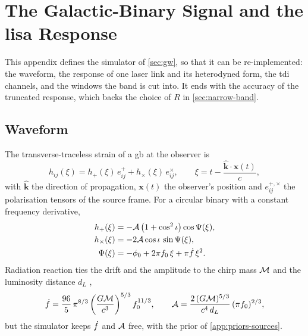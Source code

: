 \section{The Galactic-Binary Signal and the \acs{lisa} Response}
\label{app:forward-model}

This appendix defines the simulator of \cref{sec:gw}, so that it can be re-implemented: the waveform,
the response of one laser link and its heterodyned form, the \ac{tdi} channels, and the windows the
band is cut into. It ends with the accuracy of the truncated response, which backs the choice of $R$
in \cref{sec:narrow-band}.

\subsection{Waveform}
\label{app:forward-model-waveform}

The transverse-traceless strain of a \ac{gb} at the observer is
\begin{equation}
  h_{ij}(\xi) = h_+(\xi)\,e^+_{ij} + h_\times(\xi)\,e^\times_{ij},\qquad
  \xi = t - \frac{\hat{\mathbf k}\cdot\mathbf x(t)}{c},
  \label{eq:forward-model-xi}
\end{equation}
with $\hat{\mathbf k}$ the direction of propagation, $\mathbf x(t)$ the observer's position and
$e^{+,\times}_{ij}$ the polarisation tensors of the source frame. For a circular binary with a constant
frequency derivative,
\begin{equation}
\begin{aligned}
  h_+(\xi) &= -\mathcal{A}\,\bigl(1+\cos^2\iota\bigr)\cos\Psi(\xi),\\
  h_\times(\xi) &= -2\mathcal{A}\cos\iota\,\sin\Psi(\xi),\\
  \Psi(\xi) &= -\phi_0 + 2\pi f_0\,\xi + \pi\dot f\,\xi^2.
\end{aligned}
  \label{eq:forward-model-waveform}
\end{equation}
Radiation reaction ties the drift and the amplitude to the chirp mass $\mathcal{M}$ and the luminosity distance
$d_L$ \citep{maggiore2008gravitational},
\begin{equation}
  \dot f = \frac{96}{5}\,\pi^{8/3}\left(\frac{G\mathcal{M}}{c^3}\right)^{5/3} f_0^{11/3},\qquad
  \mathcal{A} = \frac{2\,(G\mathcal{M})^{5/3}}{c^4\,d_L}\,(\pi f_0)^{2/3},
  \label{eq:forward-model-fdot}
\end{equation}
but the simulator keeps $\dot f$ and $\mathcal{A}$ free, with the prior of \cref{app:priors-sources}.

